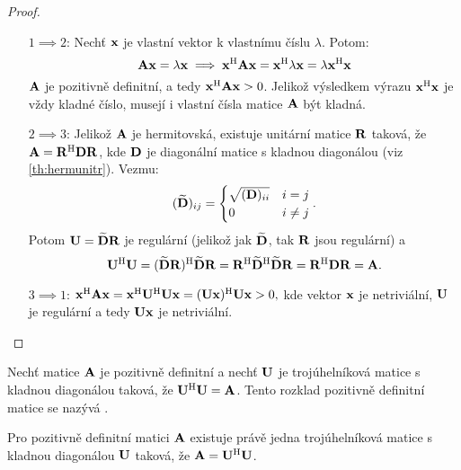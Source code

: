 \begin{proof}
    \leavevmode
    \begin{itemize}
        \item[$1 \implies 2$:] Nechť $\mathbf{x}$ je vlastní vektor k vlastnímu
            číslu $\lambda$. Potom: $$\mathbf{A}\mathbf{x} = \lambda\mathbf{x} \implies
            \mathbf{x}^{\mathrm{H}} \mathbf{A} \mathbf{x} = \mathbf{x}^{\mathrm{H}} \lambda \mathbf{x} = \lambda\mathbf{x}^{\mathrm{H}}\mathbf{x}$$
            $\mathbf{A}$ je pozitivně definitní, a tedy $\mathbf{x}^{\mathrm{H}}\mathbf{A}\mathbf{x} > 0$.
            Jelikož výsledkem výrazu $\mathbf{x}^{\mathrm{H}}\mathbf{x}$ je vždy kladné číslo,
            musejí i vlastní čísla matice $\mathbf{A}$ být kladná.
        \item[$2\implies3$:] Jelikož $\mathbf{A}$ je hermitovská, existuje unitární
            matice $\mathbf{R}$ taková, že $\mathbf{A} = \mathbf{R}^{\mathrm{H}}\mathbf{D}\mathbf{R}$, kde $\mathbf{D}$ je 
            diagonální matice s kladnou diagonálou (viz \ref{th:hermunitr}).
            Vezmu: $$(\mathbf{\widetilde{D}})_{ij} = \begin{cases}
                \sqrt{(\mathbf{D})_{ii}} &i=j \\
                0 &i \neq j
            \end{cases}.$$ Potom $\mathbf{U} = \mathbf{\widetilde{D}}\mathbf{R}$ je
            regulární (jelikož jak $\mathbf{\widetilde{D}}$, tak $\mathbf{R}$ jsou
            regulární) a $$\mathbf{U}^{\mathrm{H}}\mathbf{U} = 
            (\mathbf{\widetilde{D}}\mathbf{R})^{\mathrm{H}}\mathbf{\widetilde{D}}\mathbf{R} = 
            \mathbf{R}^{\mathrm{H}} \mathbf{\widetilde{D}}^{\mathrm{H}} \mathbf{\widetilde{D}} \mathbf{R} = 
            \mathbf{R}^{\mathrm{H}} \mathbf{D} \mathbf{R} = \mathbf{A}.$$
        \item[$3\implies1$:] $\mathbf{x}^{\mathrm{H}}\mathbf{A}\mathbf{x} = \mathbf{x}^{\mathrm{H}} \mathbf{U}^{\mathrm{H}}\mathbf{U}
            \mathbf{x} = (\mathbf{U}\mathbf{x})^{\mathrm{H}} \mathbf{U}\mathbf{x} > 0,$ kde vektor $\mathbf{x}$ je
            netriviální, $\mathbf{U}$ je regulární a tedy $\mathbf{U}\mathbf{x}$ je 
            netriviální.
    \end{itemize}
\end{proof}

\begin{definition}
    Nechť matice $\mathbf{A}$ je pozitivně definitní a nechť $\mathbf{U}$ je trojúhelníková
    matice s kladnou diagonálou taková, že $\mathbf{U}^{\mathrm{H}}\mathbf{U} = \mathbf{A}$. Tento 
    rozklad pozitivně definitní matice se nazývá .
\end{definition}

\begin{proposition}
    Pro pozitivně definitní matici $\mathbf{A}$ existuje právě jedna trojúhelníková
    matice s kladnou diagonálou $\mathbf{U}$ taková, že $\mathbf{A} = \mathbf{U}^{\mathrm{H}}\mathbf{U}$.
\end{proposition}

